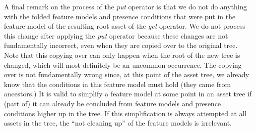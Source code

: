A final remark on the process of the \emph{put} operator is that we do not do
anything with the folded feature models and presence conditions that were put
in the feature model of the resulting root asset of the \emph{get} operator.
We do not process this change after applying the \emph{put} operator because
these changes are not fundamentally incorrect, even when they are copied over
to the original tree. Note that this copying over can only happen when the root
of the new tree is changed, which will most definitely be an uncommon occurrence.
The copying over is not fundamentally wrong since, at this point of the asset
tree, we already know that the conditions in this feature model must hold (they
came from ancestors.) It is valid to simplify a feature model at some point in
an asset tree if (part of) it can already be concluded from feature models and
presence conditions higher up in the tree. If this simplification is always
attempted at all assets in the tree, the ``not cleaning up'' of the feature
models is irrelevant.

